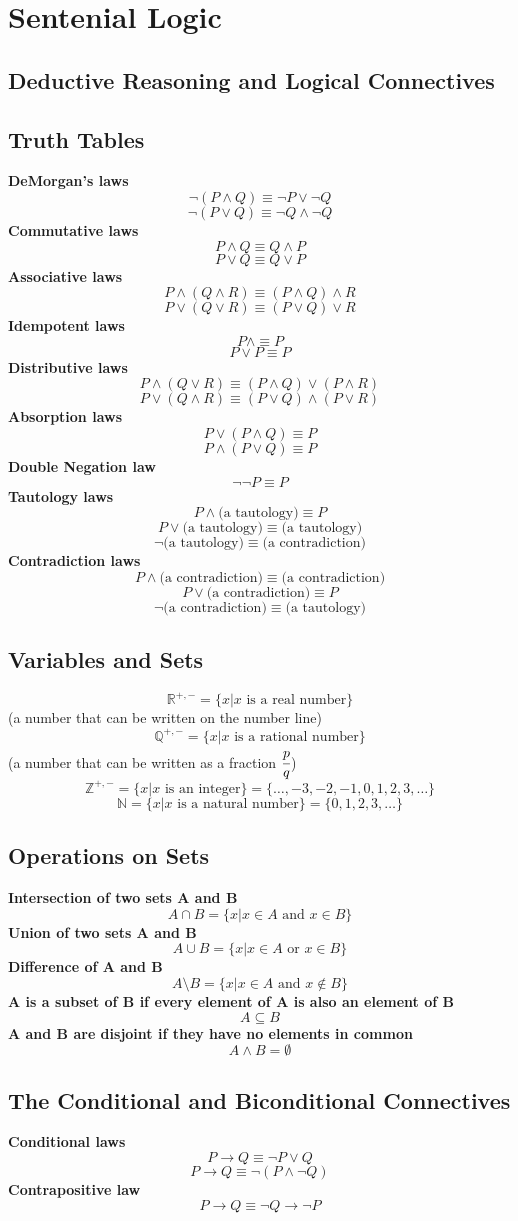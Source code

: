 \section{Sentenial Logic}
\newcommand{\definition}[1]{\textbf{#1}}
\subsection{Deductive Reasoning and Logical Connectives}
\subsection{Truth Tables}
\definition{DeMorgan's laws}
\[
\lnot (P \land Q) \equiv \lnot P \lor \lnot Q
\]
\[
\lnot (P \lor Q) \equiv \lnot Q \land \lnot Q
\]
\definition{Commutative laws}
\[
P \land Q \equiv Q \land P
\]
\[
P \lor Q \equiv Q \lor P
\]
\definition{Associative laws}
\[
P \land (Q \land R) \equiv (P \land Q) \land R
\]
\[
P \lor (Q \lor R) \equiv (P \lor Q) \lor R
\]
\definition{Idempotent laws}
\[
P \land \equiv P
\]
\[
P \lor P \equiv P
\]
\definition{Distributive laws}
\[
P \land (Q \lor R) \equiv (P \land Q) \lor (P \land R)
\]
\[
P \lor (Q \land R) \equiv (P \lor Q) \land (P \lor R)
\]
\definition{Absorption laws}
\[
P \lor (P \land Q) \equiv P
\]
\[
P \land (P \lor Q) \equiv P
\]
\definition{Double Negation law}
\[
\lnot \lnot P \equiv P
\]
\definition{Tautology laws}
\[
P \land \text{(a tautology)} \equiv P
\]
\[
P \lor \text{(a tautology)} \equiv \text{(a tautology)}
\]
\[
\lnot \text{(a tautology)} \equiv \text{(a contradiction)}
\]
\definition{Contradiction laws}
\[
P \land \text{(a contradiction)} \equiv \text{(a contradiction)}
\]
\[
P \lor \text{(a contradiction)} \equiv P
\]
\[
\lnot \text{(a contradiction)} \equiv \text{(a tautology)}
\]
\subsection{Variables and Sets}
\[
\mathbb{R}^{+,-} = \{x | x \text{ is a real number}\}
\]
(a number that can be written on the number line)
\[
\mathbb{Q}^{+,-} = \{x | x \text{ is a rational number}\}
\]
(a number that can be written as a fraction $\cfrac{p}{q}$)
\[
\mathbb{Z}^{+,-} = \{x | x \text{ is an integer}\} = \{ \ldots, -3, -2, -1, 0, 1, 2, 3, \ldots \}
\]
\[
\mathbb{N} = \{x | x \text{ is a natural number}\} = \{0, 1, 2, 3, \ldots \}
\]
\subsection{Operations on Sets}
\definition{Intersection of two sets A and B}
\[
A \cap B = \{ x | x \in A \text{ and } x \in B \}
\]
\definition{Union of two sets A and B}
\[
A \cup B = \{ x | x \in A \text{ or } x \in B \}
\]
\definition{Difference of A and B}
\[
A \setminus B = \{ x | x \in A \text{ and } x \notin B \}
\]
\definition{A is a subset of B if every element of A is also an element of B}
\[
A \subseteq B
\]
\definition{A and B are disjoint if they have no elements in common}
\[
A \land B = \emptyset
\]
\subsection{The Conditional and Biconditional Connectives}
\definition{Conditional laws}
\[
P \to Q \equiv \lnot P \lor Q
\]
\[
P \to Q \equiv \lnot (P \land \lnot Q)
\]
\definition{Contrapositive law}
\[
P \to Q \equiv \lnot Q \to \lnot P
\]
